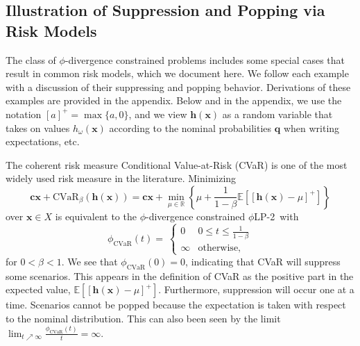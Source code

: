 \documentclass[opre,nonblindrev]{informs3} %
\newcommand{\R}{{\mathbb{R}}}
\newcommand{\E}{\mathbb{E}}
\newcommand{\e}[1]{\E \left[ #1 \right]}
\newcommand{\x}{\mathbf{x}}
\renewcommand{\c}{\mathbf{c}}
\renewcommand{\h}{\mathbf{h}}
\newcommand{\q}{\mathbf{q}}
\newcommand{\plp}{$\phi$LP-2}
\begin{document}
\subsection{Illustration of Suppression and Popping via Risk Models}
\label{ssec:special_phi}

The class of $\phi$-divergence constrained problems includes some special cases that result in common risk models, which we document here. 
We follow each example with a discussion of their suppressing and popping behavior.
Derivations of these examples are provided in the appendix.
Below and in the appendix, we use the notation $[a]^+ = \max \{a,0\}$, and we view $\h(\x)$ as a random variable that takes on values  $h_\omega(\x)$ according to the nominal probabilities $\q$ when writing expectations, etc. 


\begin{example}[CVaR]
	\label{ex:cvar}
	The coherent risk measure Conditional Value-at-Risk (CVaR) is one of the most widely used risk measure in the literature.
	Minimizing
	\[
		\c\x + \text{CVaR}_\beta(\h(\x)) = \c\x + \min_{\mu \in \R} \left\{ \mu + \frac{1}{1-\beta}\e{\left[\h(\x)-\mu\right]^+} \right\}
	\]
	over $\x \in X$ is equivalent to the $\phi$-divergence constrained \plp\ with
	\[
		\phi_{\text{CVaR}}(t) = \
		\begin{cases}
			0 & 0 \leq t \leq \frac{1}{1-\beta} \\
			\infty & \text{otherwise},
		\end{cases}
	\]
	for $0 < \beta < 1$.
	We see that $\phi_{\text{CVaR}}(0) = 0$, indicating that CVaR will suppress some scenarios.
	This appears in the definition of CVaR as the positive part in the expected value, $\e{[\h(\x)-\mu]^+}$.
	Furthermore, suppression will occur one at a time.  
	Scenarios cannot be popped because the expectation is taken with respect to the nominal distribution.
	This can also been seen by the limit $\lim_{t \nearrow \infty}\frac{\phi_{\text{CVaR}}(t)}{t}= \infty$. 
	\Halmos 
\end{example}
\end{document}
